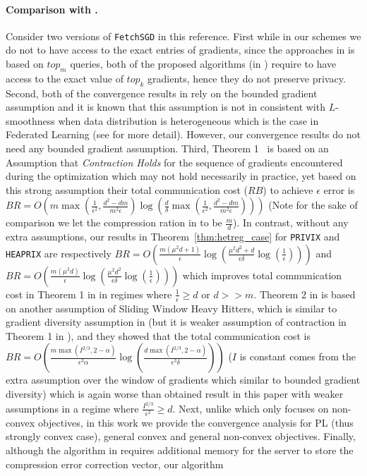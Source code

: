 \paragraph{Comparison with \cite{rothchild2020fetchsgd}.}
Consider two versions of \texttt{FetchSGD} in this reference. First while in our schemes we do not to have access to the exact entries of gradients, since the approaches in \cite{rothchild2020fetchsgd} is based on $top_m$ queries, both of the proposed algorithms (in \cite{rothchild2020fetchsgd}) require to have access to the exact value of $top_k$ gradients, hence they do not preserve privacy. Second, both of the convergence results in \cite{rothchild2020fetchsgd} rely on the bounded gradient assumption and it is known that this assumption is not in consistent with $L$-smoothness when data distribution is heterogeneous which is the case in Federated Learning (see \cite{bayoumi2020tighter} for more detail). However, our convergence results do not need any bounded gradient assumption. Third, Theorem 1~\cite{rothchild2020fetchsgd} is based on an Assumption that \emph{Contraction Holds} for the sequence of gradients encountered during the optimization which may not hold necessarily in practice, yet based on this strong assumption their total communication cost ($RB$) to achieve $\epsilon$ error is  $BR=O\left(m\max(\frac{1}{\epsilon^2},\frac{d^2-dm}{m^2\epsilon})\log\left(\frac{d}{\delta}\max(\frac{1}{\epsilon^2},\frac{d^2-dm}{m^2\epsilon})\right)\right)$ (Note for the sake of comparison we let the compression ration in \cite{rothchild2020fetchsgd} to be $\frac{m}{d}$). In contrast, without any extra assumptions, our results in Theorem~\ref{thm:hetreg_case} for \texttt{PRIVIX} and \texttt{HEAPRIX} are respectively $BR=O\left(\frac{m\left(\mu^2d+1\right)}{\epsilon}\log\left(\frac{\mu^2d^2+d}{\epsilon\delta}\log\left(\frac{1}{\epsilon}\right)\right)\right)$ and $BR=O\left(\frac{m\left(\mu^2d\right)}{\epsilon}\log\left(\frac{\mu^2d^2}{\epsilon\delta}\log\left(\frac{1}{\epsilon}\right)\right)\right)$ which improves total communication cost in Theorem 1 in \cite{rothchild2020fetchsgd} in regimes where $\frac{1}{\epsilon}\geq d$ or $d>>m$. Theorem 2 in \cite{rothchild2020fetchsgd} is based on another assumption of Sliding Window Heavy Hitters, which is similar to gradient diversity assumption in \cite{li2018federated,haddadpour2019convergence} (but it is weaker assumption of contraction in Theorem 1 in \cite{rothchild2020fetchsgd}), and they showed that the total communication cost is $BR=O\left(\frac{m\max(I^{2/3},2-\alpha)}{\epsilon^3\alpha}\log\left(\frac{d\max(I^{2/3},2-\alpha)}{\epsilon^3\delta}\right)\right)$ ($I$ is constant comes from the extra assumption over the window of gradients which similar to bounded gradient diversity) which is again worse than obtained result in this paper with weaker assumptions in a regime where $\frac{I^{2/3}}{\epsilon^2}\geq d$. Next, unlike \cite{rothchild2020fetchsgd} which only focuses on non-convex objectives, in this work we provide the convergence analysis for PL (thus strongly convex case), general convex and general non-convex objectives. Finally, although the algorithm in \cite{rothchild2020fetchsgd} requires additional memory for the server to store the compression error correction vector, our algorithm 